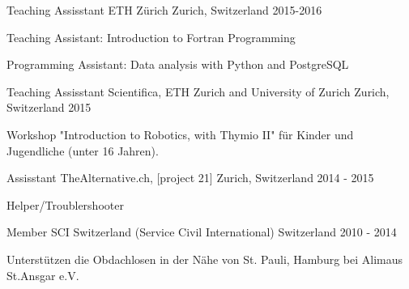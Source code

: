 

\begin{cventries}
	
\cventry
	{Teaching Assisstant} %
	{ETH Zürich} %
	{Zurich, Switzerland} %
	{2015-2016} %
	{
		\begin{cvitems} %
			\item {Teaching Assistant: Introduction to Fortran Programming}
			\item {Programming Assistant: Data analysis with Python and PostgreSQL}
		\end{cvitems}
	}

\cventry
    {Teaching Assisstant} %
    {Scientifica, ETH Zurich and University of Zurich} %
    {Zurich, Switzerland} %
    {2015} %
    {
      \begin{cvitems} %
        \item {Workshop "Introduction to Robotics, with Thymio II" für Kinder und Jugendliche (unter 16 Jahren).}
      \end{cvitems}
    }

\cventry
    {Assisstant} %
    {TheAlternative.ch, [project 21]} %
    {Zurich, Switzerland} %
    {2014 - 2015} %
    {
      \begin{cvitems} %
        \item {Helper/Troublershooter}
      \end{cvitems}
    }


\cventry
{Member} %
{SCI Switzerland (Service Civil International)} %
{Switzerland} %
{2010 - 2014} %
{
	\begin{cvitems} %
		\item {Unterstützen die Obdachlosen in der Nähe von St. Pauli, Hamburg bei Alimaus St.Ansgar e.V.}
	\end{cvitems}
}



\end{cventries}
